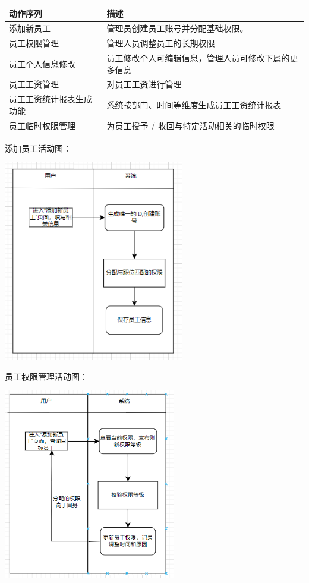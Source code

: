 \documentclass[]{article}
\begin{document}
\begin{longtable}[]{@{}ll@{}}
\toprule
动作序列 & 描述\tabularnewline
\midrule
\endhead
添加新员工 & 管理员创建员工账号并分配基础权限。\tabularnewline
员工权限管理 & 管理人员调整员工的长期权限\tabularnewline
员工个人信息修改 &
员工修改个人可编辑信息，管理人员可修改下属的更多信息\tabularnewline
员工工资管理 & 对员工工资进行管理\tabularnewline
员工工资统计报表生成功能 &
系统按部门、时间等维度生成员工工资统计报表\tabularnewline
员工临时权限管理 & 为员工授予 /
收回与特定活动相关的临时权限\tabularnewline
\bottomrule
\end{longtable}

添加员工活动图：

\includegraphics[width=3.10417in,height=3.45694in]{media/media/image8.png}

员工权限管理活动图：

\includegraphics[width=2.95972in,height=3.28333in]{media/media/image9.png}
\end{document}
